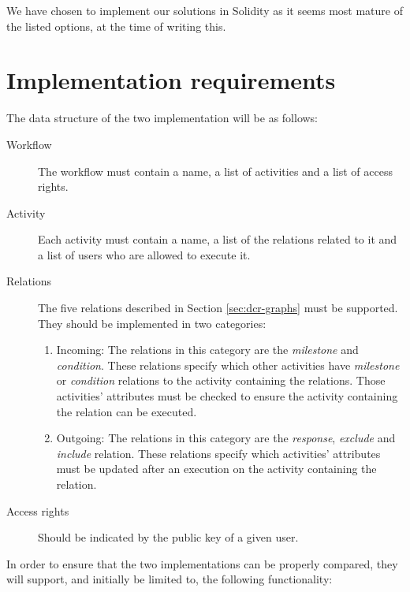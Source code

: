 \documentclass{article}
\begin{document}
		We have chosen to implement our solutions in Solidity as it seems most mature of the listed options, at the time of writing this.

	\section{Implementation requirements}
	\label{sec:implementation-requirements}
	The data structure of the two implementation will be as follows:

	\begin{description}
		\item[Workflow] The workflow must contain a name, a list of activities and a list of access rights.
		\item[Activity] Each activity must contain a name, a list of the relations related to it and a list of users who are allowed to execute it.
		\item[Relations] The five relations described in Section \ref{sec:dcr-graphs} must be supported. They should be implemented in two categories:
			\begin{enumerate}
				\item Incoming: The relations in this category are the \emph{milestone} and \emph{condition}. These relations specify which other activities have \emph{milestone} or \emph{condition} relations to the activity containing the relations. Those activities' attributes must be checked to ensure the activity containing the relation can be executed.
				\item Outgoing: The relations in this category are the \emph{response}, \emph{exclude} and \emph{include} relation. These relations specify which activities' attributes must be updated after an execution on the activity containing the relation. 
			\end{enumerate}
		\item[Access rights] Should be indicated by the public key of a given user.
	\end{description}

	In order to ensure that the two implementations can be properly compared, they will support, and initially be limited to, the following functionality: 
	
\end{document}
